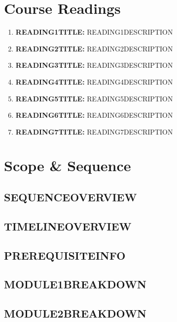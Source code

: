 \documentclass{article}
\begin{document}
\pagebreak

\section{Course Readings}

\begin{enumerate}
	
\item \textbf{READING1TITLE:} READING1DESCRIPTION

\item \textbf{READING2TITLE:} READING2DESCRIPTION

\item \textbf{READING3TITLE:} READING3DESCRIPTION

\item \textbf{READING4TITLE:} READING4DESCRIPTION

\item \textbf{READING5TITLE:} READING5DESCRIPTION

\item \textbf{READING6TITLE:} READING6DESCRIPTION

\item \textbf{READING7TITLE:} READING7DESCRIPTION

\end{enumerate}

\pagebreak

\section{Scope \& Sequence}

\subsection{SEQUENCEOVERVIEW}

\subsection{TIMELINEOVERVIEW}

\subsection{PREREQUISITEINFO}

\subsection{MODULE1BREAKDOWN}

\subsection{MODULE2BREAKDOWN}
\end{document}
